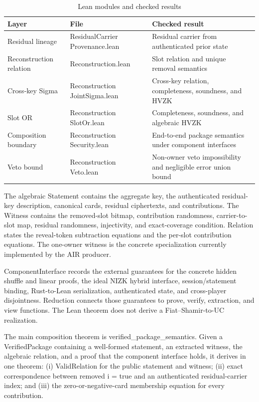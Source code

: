 \documentclass[11pt]{article}
\begin{document}
\begin{table}[htbp]
\centering
\footnotesize
\caption{Lean modules and checked results}
\begin{tabularx}{\textwidth}{>{\RaggedRight}X >{\RaggedRight}X >{\RaggedRight}X}
\toprule
Layer & File & Checked result \\
\midrule
Residual lineage & ResidualCarrier
Provenance.lean & Residual carrier from authenticated prior state \\
Reconstruction relation & Reconstruction.lean & Slot relation and unique removal semantics \\
Cross-key Sigma & Reconstruction
JointSigma.lean & Cross-key relation, completeness, soundness, and HVZK \\
Slot OR & Reconstruction
SlotOr.lean & Completeness, soundness, and algebraic HVZK \\
Composition boundary & Reconstruction
Security.lean & End-to-end package semantics under component interfaces \\
Veto bound & Reconstruction
Veto.lean & Non-owner veto impossibility and negligible error union bound \\
\bottomrule
\end{tabularx}
\end{table}

The algebraic Statement contains the aggregate key, the authenticated residual-key description, canonical cards, residual ciphertexts, and contributions. The Witness contains the removed-slot bitmap, contribution randomness, carrier-to-slot map, residual randomness, injectivity, and exact-coverage condition. Relation states the reveal-token subtraction equations and the per-slot contribution equations. The one-owner witness is the concrete specialization currently implemented by the AIR producer.

ComponentInterface records the external guarantees for the concrete hidden shuffle and linear proofs, the ideal NIZK hybrid interface, session/statement binding, Rust-to-Lean serialization, authenticated state, and cross-player disjointness. Reduction connects those guarantees to prove, verify, extraction, and view functions. The Lean theorem does not derive a Fiat–Shamir-to-UC realization.

The main composition theorem is verified\_package\_semantics. Given a VerifiedPackage containing a well-formed statement, an extracted witness, the algebraic relation, and a proof that the component interface holds, it derives in one theorem: (i) ValidRelation for the public statement and witness; (ii) exact correspondence between removed i = true and an authenticated residual-carrier index; and (iii) the zero-or-negative-card membership equation for every contribution.
\end{document}
